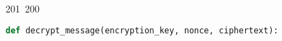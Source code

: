 201~200~\documentclass{article}
\begin{document}
\begin{lstlisting}[language=Python, caption=Decrypting a Message with ChaCha20-Poly1305]
	                                                                                                                                                                                                                                                                                                	                                                                                                                                        	    	                                                                                                	                                                                                                                                                                                                                                                                                                                                	                                                                        	                                                                        	                                                                                                                                        	                                                                                                                                                                                                                        	                                                                                                                            	                                                                	                                                                                                                                            def decrypt_message(encryption_key, nonce, ciphertext):

\end{lstlisting}
\end{document}
